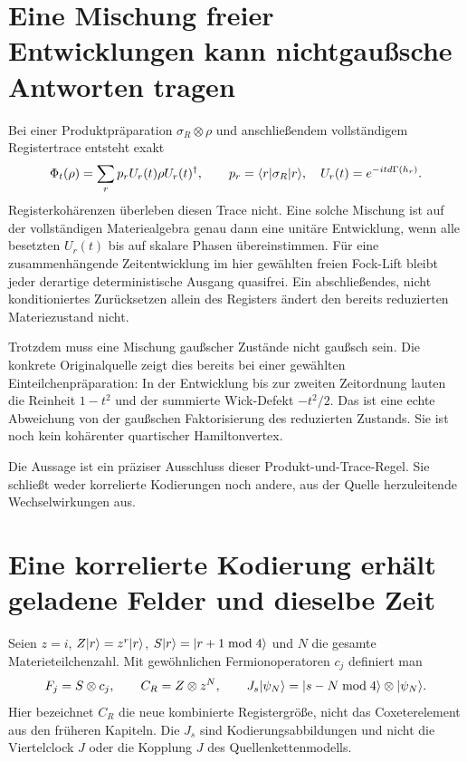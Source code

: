 \section{Eine Mischung freier Entwicklungen kann nichtgaußsche Antworten tragen}
Bei einer Produktpräparation $\sigma_R\otimes\rho$ und anschließendem vollständigem Registertrace entsteht exakt
\[
 \Phi_t(\rho)=\sum_r p_r U_r(t)\rho U_r(t)^\dagger,
 \qquad p_r=\langle r\rvert\sigma_R\lvert r\rangle,
 \quad U_r(t)=e^{-itd\Gamma(h_r)}.
\]
Registerkohärenzen überleben diesen Trace nicht. Eine solche Mischung ist auf der vollständigen Materiealgebra genau dann eine unitäre Entwicklung, wenn alle besetzten $U_r(t)$ bis auf skalare Phasen übereinstimmen. Für eine zusammenhängende Zeitentwicklung im hier gewählten freien Fock-Lift bleibt jeder derartige deterministische Ausgang quasifrei. Ein abschließendes, nicht konditioniertes Zurücksetzen allein des Registers ändert den bereits reduzierten Materiezustand nicht. 

Trotzdem muss eine Mischung gaußscher Zustände nicht gaußsch sein. Die konkrete Originalquelle zeigt dies bereits bei einer gewählten Einteilchenpräparation: In der Entwicklung bis zur zweiten Zeitordnung lauten die Reinheit $1-t^2$ und der summierte Wick-Defekt $-t^2/2$. Das ist eine echte Abweichung von der gaußschen Faktorisierung des reduzierten Zustands. Sie ist noch kein kohärenter quartischer Hamiltonvertex.


Die Aussage ist ein präziser Ausschluss dieser Produkt-und-Trace-Regel. Sie schließt weder korrelierte Kodierungen noch andere, aus der Quelle herzuleitende Wechselwirkungen aus.

\section{Eine korrelierte Kodierung erhält geladene Felder und dieselbe Zeit}
Seien $z=i$, $Z\lvert r\rangle=z^r\lvert r\rangle$, $S\lvert r\rangle=\lvert r+1\bmod4\rangle$ und $N$ die gesamte Materieteilchenzahl. Mit gewöhnlichen Fermionoperatoren $c_j$ definiert man
\[
 F_j=S\otimes c_j,\qquad
 C_R=Z\otimes z^N,\qquad
 J_s\lvert \psi_N\rangle=\lvert s-N\bmod4\rangle\otimes\lvert \psi_N\rangle.
\]
Hier bezeichnet $C_R$ die neue kombinierte Registergröße, nicht das Coxeterelement aus den früheren Kapiteln. Die $J_s$ sind Kodierungsabbildungen und nicht die Viertelclock $J$ oder die Kopplung $J$ des Quellenkettenmodells.


